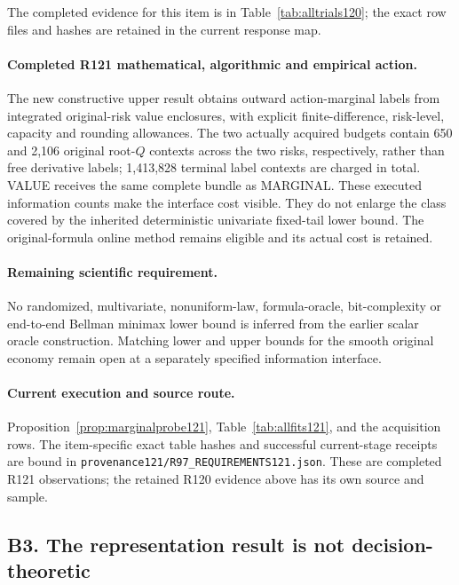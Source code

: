 The completed evidence for this item is in Table~\ref{tab:alltrials120}; the exact row files and hashes are retained in the current response map.

\paragraph{Completed R121 mathematical, algorithmic and empirical action.}
The new constructive upper result obtains outward action-marginal labels from integrated original-risk value enclosures, with explicit finite-difference, risk-level, capacity and rounding allowances. The two actually acquired budgets contain 650 and 2,106 original root-$Q$ contexts across the two risks, respectively, rather than free derivative labels; 1,413,828 terminal label contexts are charged in total. VALUE receives the same complete bundle as MARGINAL. These executed information counts make the interface cost visible. They do not enlarge the class covered by the inherited deterministic univariate fixed-tail lower bound. The original-formula online method remains eligible and its actual cost is retained.

\paragraph{Remaining scientific requirement.}
No randomized, multivariate, nonuniform-law, formula-oracle, bit-complexity or end-to-end Bellman minimax lower bound is inferred from the earlier scalar oracle construction. Matching lower and upper bounds for the smooth original economy remain open at a separately specified information interface.

\paragraph{Current execution and source route.}
Proposition~\ref{prop:marginalprobe121}, Table~\ref{tab:allfits121}, and the acquisition rows.
The item-specific exact table hashes and successful current-stage receipts are bound in \nolinkurl{provenance121/R97_REQUIREMENTS121.json}. These are completed R121 observations; the retained R120 evidence above has its own source and sample.

\subsection{B3. The representation result is not decision-theoretic}
\label{response121:B3}

